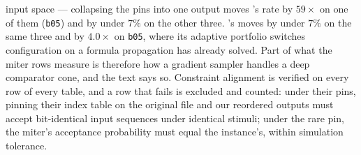 input space --- collapsing the pins into one output moves \recurrent{}'s rate by $59\times$ on one of them
(\texttt{b05}) and by under $7\%$ on the other three. \gpap{}'s moves by under $7\%$ on the
same three and by $4.0\times$ on \texttt{b05}, where its adaptive portfolio switches
configuration on a formula propagation has already solved. Part of what
the miter rows measure is therefore how a gradient sampler handles a deep comparator cone, and
the text says so. Constraint alignment is verified on every row of
every table, and a row that fails is excluded and counted: under their pins, pinning their
index table on the original file and our reordered outputs must accept bit-identical input
sequences under identical stimuli; under the rare pin, the miter's acceptance probability must
equal the instance's, within simulation tolerance.

